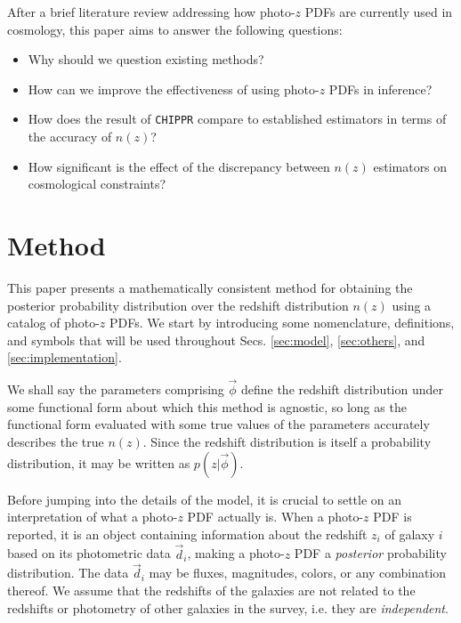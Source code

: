 \documentclass[iop]{emulateapj}
\newcommand{\chippr}{\texttt{CHIPPR} }
\begin{document}
After a brief literature review addressing how photo-$z$ PDFs are currently used in cosmology, this paper aims to answer the following questions:

\begin{itemize}
	\item Why should we question existing methods?
	\item How can we improve the effectiveness of using photo-$z$ PDFs in inference?
	\item How does the result of \chippr compare to established estimators in terms of the accuracy of $n(z)$?
	\item How significant is the effect of the discrepancy between $n(z)$ estimators on cosmological constraints?
\end{itemize}

\section{Method}
\label{sec:method}

This paper presents a mathematically consistent method for obtaining the posterior probability distribution over the redshift distribution $n(z)$ using a catalog of photo-$z$ PDFs.  We start by introducing some nomenclature, definitions, and symbols that will be used throughout Secs. \ref{sec:model}, \ref{sec:others}, and \ref{sec:implementation}.

We shall say the parameters comprising $\vec{\phi}$ define the redshift distribution under some functional form about which this method is agnostic, so long as the functional form evaluated with some true values of the parameters accurately describes the true $n(z)$.  Since the redshift distribution is itself a probability distribution, it may be written as $p(z | \vec{\phi})$.

Before jumping into the details of the model, it is crucial to settle on an interpretation of what a photo-$z$ PDF actually is.  When a photo-$z$ PDF is reported, it is an object containing information about the redshift $z_{i}$ of galaxy $i$ based on its photometric data $\vec{d}_{i}$, making a photo-$z$ PDF a \textit{posterior} probability distribution.  The data $\vec{d}_{i}$ may be fluxes, magnitudes, colors, or any combination thereof.  We assume that the redshifts of the galaxies are not related to the redshifts or photometry of other galaxies in the survey, i.e. they are \textit{independent}.
\end{document}
